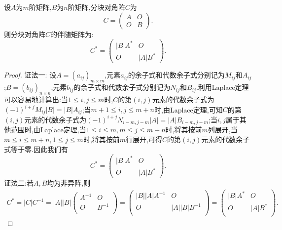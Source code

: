\documentclass[../../main.tex]{subfiles}
\begin{document}
\begin{proposition}[分块矩阵的伴随矩阵]\label{proposition:分块矩阵的伴随矩阵}
设\(A\)为\(m\)阶矩阵,\(B\)为\(n\)阶矩阵,分块对角阵\(C\)为
\[
C = 
\begin{pmatrix}
A & O \\
O & B
\end{pmatrix}.
\]
则分块对角阵$C$的伴随矩阵为:
\[
C^* = 
\begin{pmatrix}
|B|A^* & O \\
O & |A|B^*
\end{pmatrix}.
\]
\end{proposition}
\begin{proof}
{\color{blue}证法一:}
设\(A = (a_{ij})_{m\times m}\),元素\(a_{ij}\)的余子式和代数余子式分别记为\(M_{ij}\)和\(A_{ij}\);\(B = (b_{ij})_{n\times n}\),元素\(b_{ij}\)的余子式和代数余子式分别记为\(N_{ij}\)和\(B_{ij}\).利用Laplace定理可以容易地计算出:当\(1 \leqslant  i, j \leqslant  m\)时,\(C\)的第\((i, j)\)元素的代数余子式为\((-1)^{i + j}M_{ij}|B| = |B|A_{ij}\);当\(m + 1 \leqslant  i, j \leqslant  m + n\)时,由Laplace定理,可知\(C\)的第\((i, j)\)元素的代数余子式为\((-1)^{i + j}N_{i - m, j - m}|A| = |A|B_{i - m, j - m}\);当\(i, j\)属于其他范围时,由Laplace定理,当$1\leqslant  i\leqslant  m,m\leqslant  j\leqslant  m+n$时,将其按前$m$列展开,当$m\leqslant  i\leqslant  m+n,1\leqslant  j\leqslant  m$时,将其按前$m$行展开,可得\(C\)的第\((i, j)\)元素的代数余子式等于零.因此我们有
\[
C^* = 
\begin{pmatrix}
|B|A^* & O \\
O & |A|B^*
\end{pmatrix}.
\]
{\color{blue}证法二:}若\(A,B\)均为非异阵,则
\begin{align*}
C^*=\left| C \right|C^{-1}=\left| A \right|\left| B \right|\left( \begin{matrix}
A^{-1}&		O\\
O&		B^{-1}\\
\end{matrix} \right) =\left( \begin{matrix}
\left| B \right|\left| A \right|A^{-1}&		O\\
O&		\left| A \right|\left| B \right|B^{-1}\\
\end{matrix} \right) =\left( \begin{matrix}
|B|A^*&		O\\
O&		|A|B^*\\
\end{matrix} \right) .
\end{align*}


\end{proof}
\end{document}
